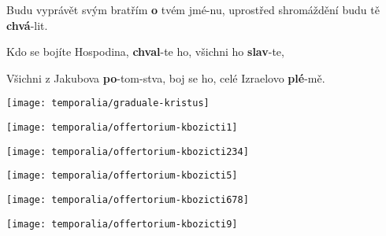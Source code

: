 \documentclass[a4paper, twoside, 12pt]{article}
\begin{document}
 Budu vyprávět svým bratřím \hspace{2mm} \textbf{o} tvém jmé-nu, uprostřed shromáždění budu tě \textbf{chvá}-lit.

 Kdo se bojíte Hospodina, \hspace{6mm} \textbf{chval}-te ho, \hspace{5mm} všichni ho \hspace{20.5mm} \textbf{slav}-te,

 Všichni z Jakubova \hspace{16mm} \textbf{po}-tom-stva, \hspace{3mm} boj se ho, celé Izraelovo \hspace{1mm} \textbf{plé}-mě.~\Rbardot{}

\vspace{4mm}


\noindent \texttt{[image: temporalia/graduale-kristus]}



\trChristus

 


\trCredo
  
\vspace{4mm}


\noindent \texttt{[image: temporalia/offertorium-kbozicti1]}

\noindent \texttt{[image: temporalia/offertorium-kbozicti234]}

\noindent \texttt{[image: temporalia/offertorium-kbozicti5]}

\noindent \texttt{[image: temporalia/offertorium-kbozicti678]}

\noindent \texttt{[image: temporalia/offertorium-kbozicti9]}

\vspace{4mm}
\end{document}
